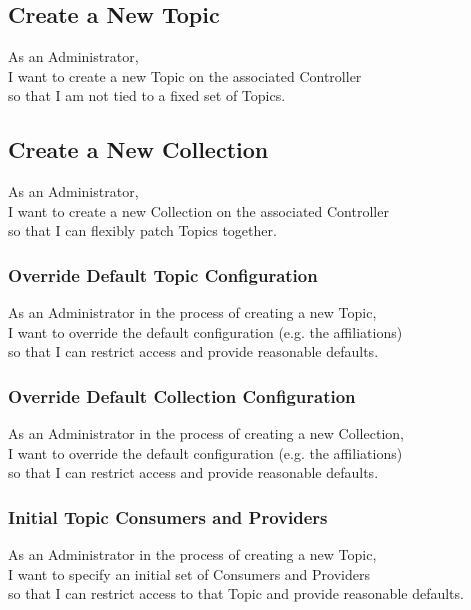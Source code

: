 \subsection{Create a New Topic}

As an Administrator,\\
I want to create a new Topic on the associated Controller\\
so that I am not tied to a fixed set of Topics.

\subsection{Create a New Collection}

As an Administrator,\\
I want to create a new Collection on the associated Controller\\
so that I can flexibly patch Topics together.

\subsubsection{Override Default Topic Configuration}

As an Administrator in the process of creating a new Topic,\\
I want to override the default configuration (e.g. the affiliations) \\
so that I can restrict access and provide reasonable defaults.

\subsubsection{Override Default Collection Configuration}

As an Administrator in the process of creating a new Collection,\\
I want to override the default configuration (e.g. the affiliations) \\
so that I can restrict access and provide reasonable defaults.

\subsubsection{Initial Topic Consumers and Providers}

As an Administrator in the process of creating a new Topic,\\
I want to specify an initial set of Consumers and Providers \\
so that I can restrict access to that Topic and provide reasonable defaults.

